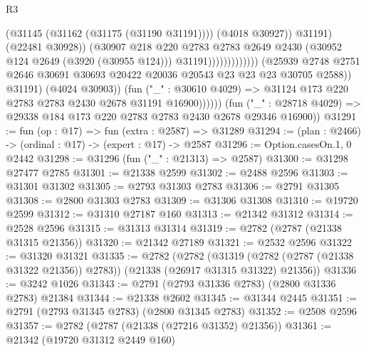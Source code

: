 \begin{lexlean}{R3}
\begin{coremodule}
                                                    (@31145 (@31162 (@31175 (@31190 @31191))))
                                                    (@4018 @30927))
                                                  @31191)
                                                (@22481 @30928))
                                              (@30907
                                                @218
                                                @220
                                                @2783
                                                @2783
                                                @2649
                                                @2430
                                                (@30952 @124 @2649 (@3920 (@30955 @124)))
                                                @31191)))))))))))))
                      (@25939
                        @2748
                        @2751
                        @2646
                        @30691
                        @30693
                        @20422
                        @20036
                        @20543
                        @23
                        @23
                        @23
                        @30705
                        @2588))
                    @31191)
                  (@4024 @30903))
                (fun ("_" : @30610 @4029) =>
                @31124 @173 @220 @2783 @2783 @2430 @2678 @31191 @16900))))))
      (fun ("_" : @28718 @4029) => @29338 @184 @173 @220 @2783 @2783 @2430 @2678 @29346 @16900))
@31291 := fun (op : @17) => fun (extra : @2587) => @31289
@31294 := (plan : @2466) -> (ordinal : @17) -> (expert : @17) -> @2587
@31296 := Option.casesOn.{1, 0} @2442
@31298 := @31296 (fun ("_" : @21313) => @2587)
@31300 := @31298 @27477 @2785
@31301 := @21338 @2599
@31302 := @2488 @2596
@31303 := @31301 @31302
@31305 := @2793 @31303 @2783
@31306 := @2791 @31305
@31308 := @2800 @31303 @2783
@31309 := @31306 @31308
@31310 := @19720 @2599
@31312 := @31310 @27187 @160
@31313 := @21342 @31312
@31314 := @2528 @2596
@31315 := @31313 @31314
@31319 := @2782 (@2787 (@21338 @31315 @21356))
@31320 := @21342 @27189
@31321 := @2532 @2596
@31322 := @31320 @31321
@31335 := @2782
    (@2782
      (@31319 (@2782 (@2787 (@21338 @31322 @21356)) @2783))
      (@21338 (@26917 @31315 @31322) @21356))
@31336 := @3242 @1026
@31343 := @2791 (@2793 @31336 @2783) (@2800 @31336 @2783) @21384
@31344 := @21338 @2602
@31345 := @31344 @2445
@31351 := @2791 (@2793 @31345 @2783) (@2800 @31345 @2783)
@31352 := @2508 @2596
@31357 := @2782 (@2787 (@21338 (@27216 @31352) @21356))
@31361 := @21342 (@19720 @31312 @2449 @160)

\end{coremodule}
\end{lexlean}
